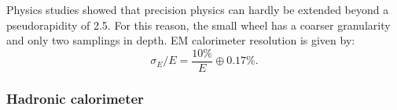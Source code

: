 Physics studies showed that precision physics can hardly be extended beyond a pseudorapidity of 2.5. For this reason, the small wheel has a coarser granularity and only two samplings in depth. EM calorimeter resolution is given by:
\begin{equation}
    \sigma_E/E = \frac{10\%}{E} \oplus 0.17\%.
\end{equation}
\subsubsection{Hadronic calorimeter}
\label{chap2:ATLAS:Calo:HCAL}


